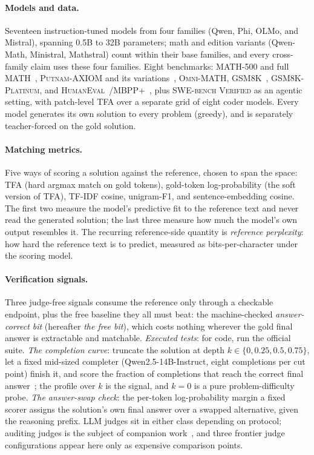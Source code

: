 \documentclass[11pt]{article}
\newcommand{\tfa}{\textsc{TFA}}
\begin{document}
\paragraph{Models and data.}
Seventeen instruction-tuned models from four families (Qwen, Phi, OLMo, and Mistral), spanning 0.5B to 32B parameters; math and edition variants (Qwen-Math, Ministral, Mathstral) count within their base families, and every cross-family claim uses these four families.
Eight benchmarks: \textsc{MATH-500} and full \textsc{MATH}~\cite{hendrycks2021math}, \textsc{Putnam-AXIOM} and its variations~\cite{gulati2025putnam}, \textsc{Omni-MATH}, \textsc{GSM8K}~\cite{cobbe2021gsm8k}, \textsc{GSM8K-Platinum}, and \textsc{HumanEval}~\cite{chen2021codex}/\textsc{MBPP+}~\cite{austin2021mbpp,liu2023evalplus}, plus \textsc{SWE-bench Verified} as an agentic setting, with patch-level \tfa{} over a separate grid of eight coder models.
Every model generates its own solution to every problem (greedy), and is separately teacher-forced on the gold solution.

\paragraph{Matching metrics.}
Five ways of scoring a solution against the reference, chosen to span the space: \tfa{} (hard argmax match on gold tokens), gold-token log-probability (the soft version of \tfa), TF-IDF cosine, unigram-F1, and sentence-embedding cosine.
The first two measure the model's predictive fit to the reference text and never read the generated solution; the last three measure how much the model's own output resembles it.
The recurring reference-side quantity is \emph{reference perplexity}: how hard the reference text is to predict, measured as bits-per-character under the scoring model.

\paragraph{Verification signals.}
Three judge-free signals consume the reference only through a checkable endpoint, plus the free baseline they all must beat: the machine-checked \emph{answer-correct bit} (hereafter \emph{the free bit}), which costs nothing wherever the gold final answer is extractable and matchable.
\emph{Executed tests}: for code, run the official suite.
\emph{The completion curve}: truncate the solution at depth $k \in \{0, 0.25, 0.5, 0.75\}$, let a fixed mid-sized completer (Qwen2.5-14B-Instruct, eight completions per cut point) finish it, and score the fraction of completions that reach the correct final answer~\cite{lightman2023verify,wang2022selfconsistency,wang2024mathshepherd,luo2024omegaprm}; the profile over $k$ is the signal, and $k{=}0$ is a pure problem-difficulty probe.
\emph{The answer-swap check}: the per-token log-probability margin a fixed scorer assigns the solution's own final answer over a swapped alternative, given the reasoning prefix.
LLM judges sit in either class depending on protocol; auditing judges is the subject of companion work~\cite{companionA}, and three frontier judge configurations appear here only as expensive comparison points.
\end{document}
